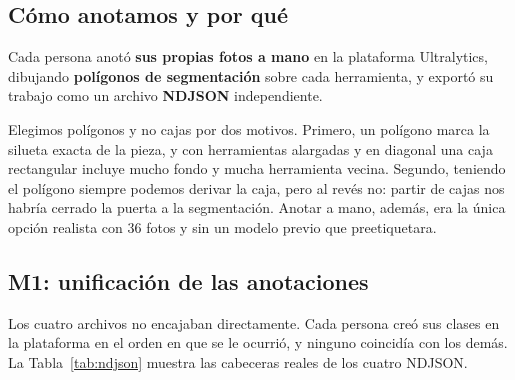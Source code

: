 \documentclass[11pt,a4paper]{article}
\begin{document}
\subsection{Cómo anotamos y por qué}

Cada persona anotó \textbf{sus propias fotos a mano} en la plataforma Ultralytics, dibujando
\textbf{polígonos de segmentación} sobre cada herramienta, y exportó su trabajo como un archivo
\textbf{NDJSON} independiente.

Elegimos polígonos y no cajas por dos motivos. Primero, un polígono marca la silueta exacta de la
pieza, y con herramientas alargadas y en diagonal una caja rectangular incluye mucho fondo y mucha
herramienta vecina. Segundo, teniendo el polígono siempre podemos derivar la caja, pero al revés
no: partir de cajas nos habría cerrado la puerta a la segmentación. Anotar a mano, además, era la
única opción realista con 36 fotos y sin un modelo previo que preetiquetara.

\subsection{M1: unificación de las anotaciones}

Los cuatro archivos no encajaban directamente. Cada persona creó sus clases en la plataforma en el
orden en que se le ocurrió, y ninguno coincidía con los demás. La Tabla~\ref{tab:ndjson} muestra
las cabeceras reales de los cuatro NDJSON.
\end{document}
